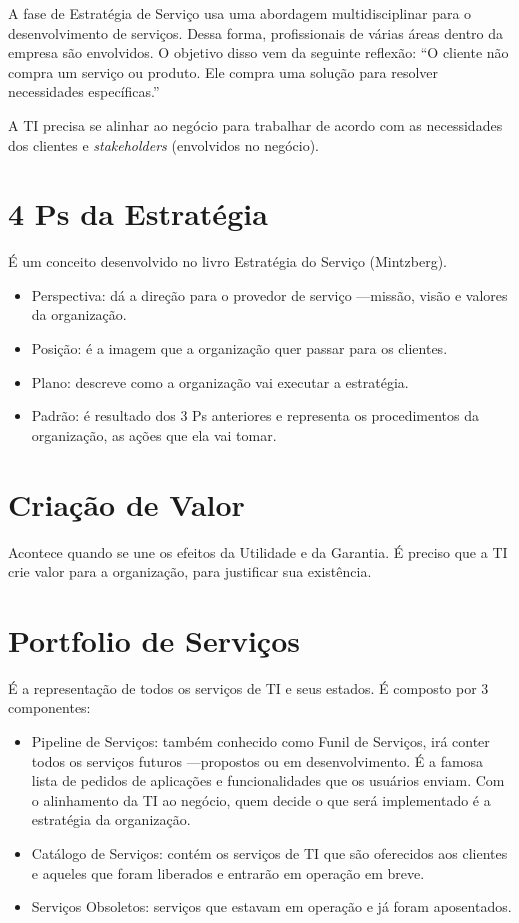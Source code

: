 A fase de Estratégia de Serviço usa uma abordagem multidisciplinar para o
desenvolvimento de serviços. Dessa forma, profissionais de várias áreas dentro
da empresa são envolvidos. O objetivo disso vem da seguinte reflexão: ``O
cliente não compra um serviço ou produto. Ele compra uma solução para resolver
necessidades específicas.''

A TI precisa se alinhar ao negócio para trabalhar de acordo com as necessidades
dos clientes e \emph{stakeholders} (envolvidos no negócio).


\section{4 Ps da Estratégia}
\label{sec:estrat:4ps}

É um conceito desenvolvido no livro Estratégia do Serviço (Mintzberg).
\begin{itemize}
    \item Perspectiva: dá a direção para o provedor de serviço ---missão, visão
        e valores da organização.
	\item Posição: é a imagem que a organização quer passar para os clientes.
	\item Plano: descreve como a organização vai executar a estratégia.
    \item Padrão: é resultado dos 3 Ps anteriores e representa os procedimentos
        da organização, as ações que ela vai tomar.
\end{itemize}


\section{Criação de Valor}
Acontece quando se une os efeitos da Utilidade e da Garantia. É preciso que a
TI crie valor para a organização, para justificar sua existência.


\section{Portfolio de Serviços}
É a representação de todos os serviços de TI e seus estados. É composto por 3
componentes:
\begin{itemize}
    \item Pipeline de Serviços: também conhecido como Funil de Serviços, irá
        conter todos os serviços futuros ---propostos ou em desenvolvimento. É
        a famosa lista de pedidos de aplicações e funcionalidades que os
        usuários enviam. Com o alinhamento da TI ao negócio, quem decide o que
        será implementado é a estratégia da organização.
    \item Catálogo de Serviços: contém os serviços de TI que são oferecidos aos
        clientes e aqueles que foram liberados e entrarão em operação em breve.
    \item Serviços Obsoletos: serviços que estavam em operação e já foram
        aposentados.
\end{itemize}


